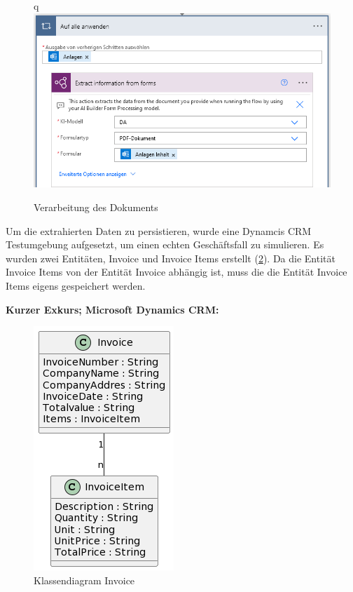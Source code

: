 \begin{figure}[H]q
    \centering
    \includegraphics[scale=0.8]{sections/cloud-computing/images/power-automate-flow/ai-model-in-use.png}
    \caption{Verarbeitung des Dokuments}
    \label{fig:ai-model-in-use}
\end{figure}

Um die extrahierten Daten zu persistieren, wurde eine Dynamcis CRM Testumgebung aufgesetzt, um einen echten Geschäftsfall zu simulieren. Es wurden zwei Entitäten, Invoice und Invoice Items erstellt (\ref{fig:class-diagram}). Da die Entität Invoice Items von der Entität Invoice abhängig ist, muss die die Entität Invoice Items eigens gespeichert werden.

\textbf{Kurzer Exkurs; Microsoft Dynamics CRM:}


\begin{figure}[h]
    \centering
    \includegraphics[scale=0.5]{sections/cloud-computing/images/power-automate-flow/cld.png}
    \caption{Klassendiagram Invoice}
    \label{fig:class-diagram}
\end{figure}

